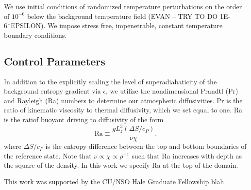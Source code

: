 \documentclass[aps, prl, twocolumn, groupedaddress]{revtex4-1}
\begin{document}
We use initial conditions of randomized temperature perturbations on the order of $10^{-6}$ below the background
temperature field (EVAN -- TRY TO DO 1E-6*EPSILON). We impose stress free, impenetrable, constant temperature boundary
conditions.

\subsection{Control Parameters}
In addition to the explicitly scaling the level of superadiabaticity of the background entropy gradient via $\epsilon$,
we utilize the nondimensional Prandtl (Pr) and Rayleigh (Ra) numbers to determine our atmospheric diffusivities.  Pr
is the ratio of kinematic viscosity to thermal diffusivity, which we set equal to one.  Ra is the ratiof buoyant driving
to diffusivity of the form
\begin{equation}
\text{Ra} \equiv \frac{g L_z^3 (\Delta S/c_P)}{\nu\chi},
	\label{eqn:ra_def}
\end{equation}
where $\Delta S/c_P$ is the entropy difference between the top and bottom boundaries of the reference state.  Note that
$\nu \propto \chi \propto \rho^{-1}$ such that Ra increases with depth as the square of the density.  In this work we
specify Ra at the top of the domain.

\begin{acknowledgements}
This work was supported by the CU/NSO Hale Graduate Fellowship blah.
\end{acknowledgements}


\end{document}
